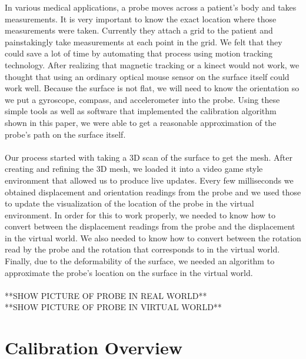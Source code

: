 \documentclass[conference]{acmsiggraph}
\begin{document}
In various medical applications, a probe moves across a patient's body and takes measurements. It is very important to know the exact location where those measurements were taken. Currently they attach a grid to the patient and painstakingly take measurements at each point in the grid. We felt that they could save a lot of time by automating that process using motion tracking technology. After realizing that magnetic tracking or a kinect would not work, we thought that using an ordinary optical mouse sensor on the surface itself could work well. Because the surface is not flat, we will need to know the orientation so we put a gyroscope, compass, and accelerometer into the probe. Using these simple tools as well as software that implemented the calibration algorithm shown in this paper, we were able to get a reasonable approximation of the probe's path on the surface itself.\\
\\
Our process started with taking a 3D scan of the surface to get the mesh. After creating and refining the 3D mesh, we loaded it into a video game style environment that allowed us to produce live updates. Every few milliseconds we obtained displacement and orientation readings from the probe and we used those to update the visualization of the location of the probe in the virtual environment. In order for this to work properly, we needed to know how to convert between the displacement readings from the probe and the displacement in the virtual world. We also needed to know how to convert between the rotation read by the probe and the rotation that corresponds to in the virtual world. Finally, due to the deformability of the surface, we needed an algorithm to approximate the probe's location on the surface in the virtual world.\\
\\
**SHOW PICTURE OF PROBE IN REAL WORLD**\\
**SHOW PICTURE OF PROBE IN VIRTUAL WORLD**

\section{Calibration Overview}
\end{document}
